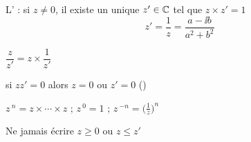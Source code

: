 \begin{frame}

\vspace*{1cm}

 \begin{itemize} 
  \item L' : si $z \neq 0$, il existe un unique $z' \in \mathbb{C}$ tel
  que $z \times z' = 1$
\pause
\[ z' = \frac{1}{z} = \frac{a - \ii b}{a^2 + b^2}  \]

\pause
{
  \item %
$\dfrac{z}{z'}=z \times \dfrac{1}{z'}$\\[1em]
     
\pause

  \item  si \quad  $zz' = 0$ \quad  alors \quad  $z = 0$ ou $z' = 0$ \qquad  ()\\[1em]

\pause
  
  \item %
$z{\,}^n = z \times \cdots \times z$ \quad ; \quad  $z{\,}^0 = 1$ \quad ; \quad $z{\,}^{- n} = \big( \frac 1 z \big)^n$
}

\end{itemize}

\pause
\bigskip
\bigskip

\begin{remarque}
  Ne \alert{jamais} écrire $z \geqslant 0$ ou $z \leqslant z'$
\end{remarque}


\end{frame}
